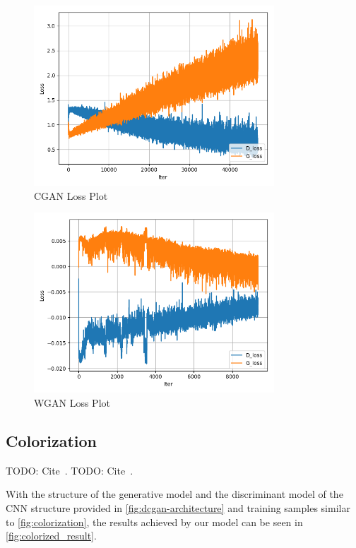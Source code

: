 \documentclass[conference]{IEEEtran}
\begin{document}
    \begin{figure}
        \caption{CGAN Loss Plot}
        \label{fig:loss-plot-cgan}
        \includegraphics[width=9cm]{CGAN_loss.png}
        \centering
    \end{figure}

    \begin{figure}
        \caption{WGAN Loss Plot}
        \label{fig:loss-plot-wgan}
        \includegraphics[width=9cm]{WGAN_loss.png}
        \centering
    \end{figure}

    \subsection{Colorization}\label{subsec:results-colorization}

    TODO: Cite~\cite{e-in-style}.
    TODO: Cite~\cite{pytorch-generative-model-collections}.

    With the structure of the generative model and the discriminant model of the CNN structure provided in \autoref{fig:dcgan-architecture} and training samples similar to \autoref{fig:colorization}, the results achieved by our model can be seen in \autoref{fig:colorized_result}.
\end{document}
